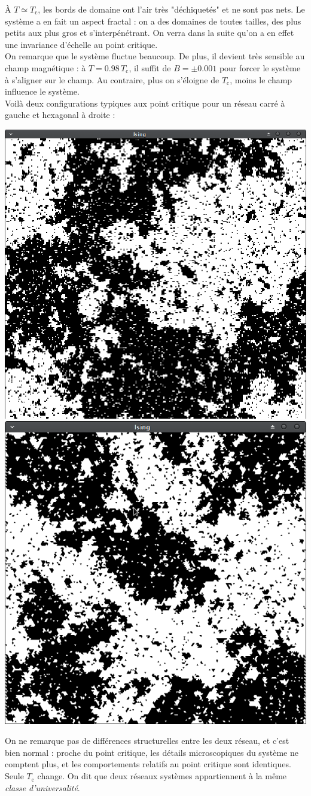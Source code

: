 \documentclass{book}
\begin{document}
\begin{correction}
À $T \simeq T_\text{c}$, les bords de domaine ont l'air très "déchiquetés" et ne sont pas nets. Le système a en fait un aspect fractal : on a des domaines de toutes tailles, des plus petits aux plus gros et s'interpénétrant. On verra dans la suite qu'on a en effet une invariance d'échelle au point critique.\\

On remarque que le système fluctue beaucoup. De plus, il devient très sensible au champ magnétique : à $T = 0.98 \, T_\text{c}$, il suffit de $B=\pm 0.001$ pour forcer le système à s'aligner sur le champ. Au contraire, plus on s'éloigne de $T_\text{c}$, moins le champ influence le système.\\

Voilà deux configurations typiques aux point critique pour un réseau carré à gauche et hexagonal à droite :
\begin{center}
\includegraphics[height=0.46\linewidth]{TD3/T_sur_Tc_1.0.png}
\includegraphics[height=0.46\linewidth]{TD3/T_sur_Tc_1.0_hexa.png}
\end{center}
On ne remarque pas de différences structurelles entre les deux réseau, et c'est bien normal : proche du point critique, les détails microscopiques du système ne comptent plus, et les comportements relatifs au point critique sont identiques. Seule $T_\text{c}$ change. On dit que deux réseaux systèmes appartiennent à la même \emph{classe d'universalité}.
\end{correction}
\end{document}
